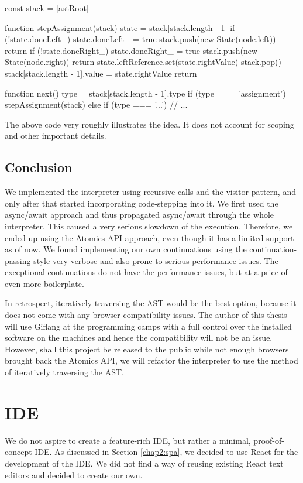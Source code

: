 \begin{code}
const stack = [astRoot]

function stepAssignment(stack) {
    state = stack[stack.length - 1]
    if (!state.doneLeft_) {
        state.doneLeft_ = true
        stack.push(new State(node.left))
        return
    }
    if (!state.doneRight_) {
        state.doneRight_ = true
        stack.push(new State(node.right))
        return
    }
    state.leftReference.set(state.rightValue)
    stack.pop()
    stack[stack.length - 1].value = state.rightValue
    return
}

function next() {
    type = stack[stack.length - 1].type
    if (type === 'assignment') {
        stepAssignment(stack)
    } else if (type === '...') {
        // ...
    }
}
\end{code}

The above code very roughly illustrates the idea. It does not account for scoping and other important details.

\subsection*{Conclusion}
We implemented the interpreter using recursive calls and the visitor pattern, and only after that started incorporating code-stepping into it. We first used
the async/await approach and thus propagated async/await through the whole interpreter. This caused a very serious slowdown of the execution. Therefore, we ended
up using the Atomics API approach, even though it has a limited support as of now. We found implementing our own continuations using the continuation-passing style
very verbose and also prone to serious performance issues. The exceptional continuations do not have the performance issues, but at a price of even more boilerplate.

In retrospect, iteratively traversing the AST would be the best option, because it does not come with any browser compatibility issues. The author of this thesis
will use Giflang at the programming camps with a full control over the installed software on the machines and hence the compatibility will not be an issue.
However, shall this project be released to the public while not enough browsers brought back the Atomics API, we will refactor the interpreter to
use the method of iteratively traversing the AST.

\section{IDE}
We do not aspire to create a feature-rich IDE, but rather a minimal, proof-of-concept IDE. As discussed in Section \ref{chap2:spa}, we decided to use React
for the development of the IDE. We did not find a way of reusing existing React text editors and decided to create our own.

